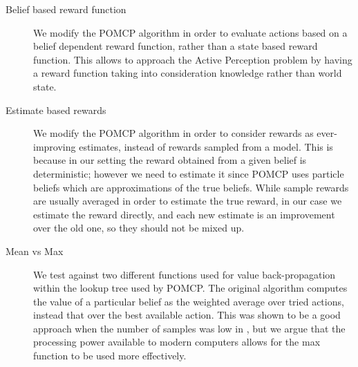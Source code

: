 \begin{description}
    \item[Belief based reward function] We modify the POMCP algorithm in order to evaluate actions
        based on a belief dependent reward function, rather than a state based reward function. This
        allows to approach the Active Perception problem by having a reward function taking into
        consideration knowledge rather than world state.
    \item[Estimate based rewards] We modify the POMCP algorithm in order to consider rewards as
        ever-improving estimates, instead of rewards sampled from a model. This is because in our
        setting the reward obtained from a given belief is deterministic; however we need to estimate
        it since POMCP uses particle beliefs which are approximations of the true beliefs. While
        sample rewards are usually averaged in order to estimate the true reward, in our case we
        estimate the reward directly, and each new estimate is an improvement over the old one, so they
        should not be mixed up.
    \item[Mean vs Max] We test against two different functions used for value back-propagation within
        the lookup tree used by POMCP. The original algorithm computes the value of a particular
        belief as the weighted average over tried actions, instead that over the best available
        action. This was shown to be a good approach when the number of samples was low in
        \cite{cit:mcts}, but we argue that the processing power available to modern computers allows
        for the max function to be used more effectively.
\end{description}

